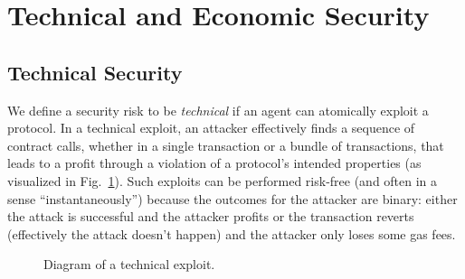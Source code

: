 \section{Technical and Economic Security}
\subsection{Technical Security}
\label{sec:5:technical-security}

We define a security risk to be \emph{technical} if an agent can atomically exploit a protocol.
In a technical exploit, an attacker effectively finds a sequence of contract calls, whether in a single transaction or a bundle of transactions, that leads to a profit through a violation of a protocol's intended properties (as visualized in Fig.~\ref{fig:technical-security-illustration}).
Such exploits can be performed risk-free (and often in a sense ``instantaneously'') because the outcomes for the attacker are binary: either the attack is successful and the attacker profits or the transaction reverts (effectively the attack doesn't happen) and the attacker only loses some gas fees.

\begin{figure}[htp]
  \centering
  \caption{Diagram of a technical exploit.}
  \label{fig:technical-security-illustration}
\end{figure}

